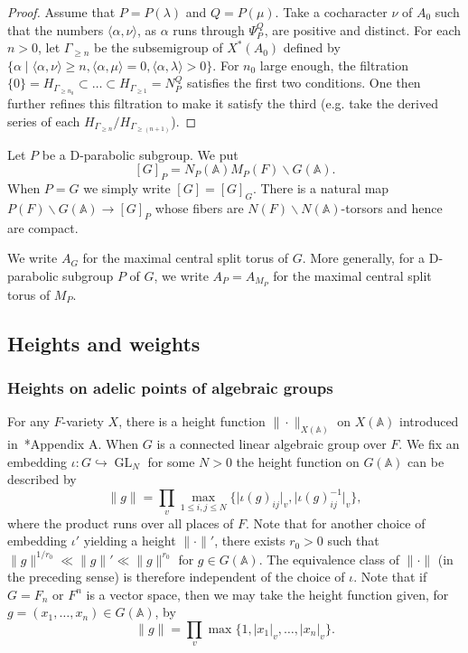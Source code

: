 \documentclass[letterpaper,11pt]{amsart}
\newcommand{\bA}{\mathbb{A}}
\newcommand{\bs}{\backslash}
\newcommand{\<}{\negthickspace}
\providecommand{\abs}[1]{\lvert#1\rvert}
\providecommand{\aabs}[1]{\lVert#1\rVert}
\DeclareMathOperator{\GL}{GL}
\theoremstyle{definition}
\theoremstyle{plain}
\theoremstyle{remark}
\numberwithin{equation}{section}
\begin{document}
\begin{proof}
Assume that $P=P(\lambda)$ and $Q=P(\mu)$. Take a
cocharacter $\nu$ of $A_0$ such that the numbers $\langle \alpha,\nu \rangle$, as
$\alpha$ runs through $\Psi_P^Q$, are positive and distinct. For each $n>0$,
let $\Gamma_{\ge n}$ be the subsemigroup of $X^*(A_0)$ defined by $\{ \alpha
\mid \langle \alpha, \nu \rangle  \ge n, \langle \alpha,\mu \rangle = 0, \langle \alpha, \lambda \rangle >0 \} $. For $n_0$ large enough, the filtration $\{0\}=H_{\Gamma_{\geq n_0}} \subset \hdots \subset H_{\Gamma_{\geq 1}}=N_{P}^Q$ satisfies the first two conditions. One then further refines this filtration to make it satisfy the third (e.g. take the derived series of each $H_{\Gamma_{\ge n}}/H_{\Gamma_{\ge (n+1)}}$).
\end{proof}

Let $P$ be a D-parabolic subgroup. We put
    \[
    [G]_P = N_P(\bA)M_P(F) \bs G(\bA).
    \]
When $P = G$ we simply write $[G]= [G]_G$. There is a natural map $P(F) \bs
G(\bA) \to [G]_P$ whose fibers are $N(F) \bs N(\bA)$-torsors and hence are compact.

We write $A_G$ for the maximal central split torus of $G$. More generally, for a D-parabolic subgroup $P$ of $G$, we write $A_P = A_{M_P}$ for the maximal central split torus of $M_P$.


\subsection{Heights and weights}
\label{subsection:Heights_weights}

\subsubsection{Heights on adelic points of algebraic groups} For any $F$-variety $X$, there is a height function $\| \cdot \|_{X(\bA)}$ on $X(\bA)$ introduced in~\cite{BP}*{Appendix A}. When $G$ is a connected linear algebraic group over $F$. We fix an embedding $\iota: G \hookrightarrow \GL_N$ for some $N>0$ the height function on
$G(\bA)$ can be described by
    \begin{equation} \label{eq:height_funtion_on_group}
            \aabs{g} = \prod_v \max_{1 \leq i, j \leq N}
    \{ \abs{\iota(g)_{ij}}_v, \abs{\iota(g)^{-1}_{ij}}_v\},
    \end{equation}
where the product runs over all places of $F$. Note that for another choice of embedding $\iota'$ yielding a height $\aabs{\cdot}'$, there exists $r_0>0$ such that $\aabs{g}^{1/r_0} \ll \aabs{g}' \ll \aabs{g}^{r_0}$ for $g \in G(\bA)$. The equivalence class of $\aabs{\cdot}$ (in the preceding sense) is therefore independent of the choice of $\iota$. Note that if $G = F_n$ or $F^n$ is a vector space, then we may take the height function given, for $g = (x_1, \hdots, x_n) \in G(\bA)$, by
    \begin{equation}    \label{eq:height_vector_spaces}
    \aabs{g} = \prod_v \max\{1, \abs{x_1}_v, \hdots, \abs{x_n}_v\}.
    \end{equation}
\end{document}
